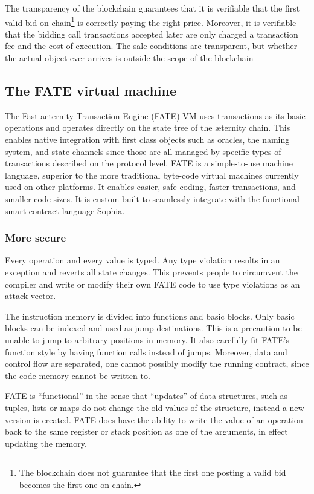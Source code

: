 The transparency of the blockchain guarantees that it is verifiable
that the first valid bid on chain\footnote{The blockchain
  does not guarantee that the first one posting a valid bid becomes
  the first one on chain.} is correctly paying the right
price. Moreover, it is verifiable that the bidding call transactions accepted later are
only charged a transaction fee and the cost of execution.
The sale conditions are transparent, but whether the actual object ever
arrives is outside the scope of the blockchain

\subsection{The FATE virtual machine}
\label{sect:fate}

The Fast aeternity Transaction Engine (FATE) VM uses transactions as
its basic operations and operates directly on the state tree of the
æternity chain. This enables native integration with first class
objects such as oracles, the naming system, and state channels since
those are all managed by specific types of transactions described on
the protocol level. FATE is a simple-to-use machine language, superior
to the more traditional byte-code virtual machines currently used on
other platforms. It enables easier, safe coding, faster transactions,
and smaller code sizes. It is custom-built to seamlessly integrate
with the functional smart contract language Sophia.

\subsubsection{More secure}

Every operation and every value is typed. Any type violation results in
an exception and reverts all state changes. This prevents people to
circumvent the compiler and write or modify their own FATE code to use
type violations as an attack vector.

The instruction memory is divided into functions and basic
blocks. Only basic blocks can be indexed and used as jump
destinations. This is a precaution to be unable to jump to arbitrary
positions in memory. It also carefully fit FATE's function style by
having function calls instead of jumps. Moreover, data and control
flow are separated, one cannot possibly modify the running
contract, since the code memory cannot be written to.

FATE is “functional” in the sense that “updates” of data structures,
such as tuples, lists or maps do not change the old values of the
structure, instead a new version is created.  FATE does have the
ability to write the value of an operation back to the same register
or stack position as one of the arguments, in effect updating the
memory.

